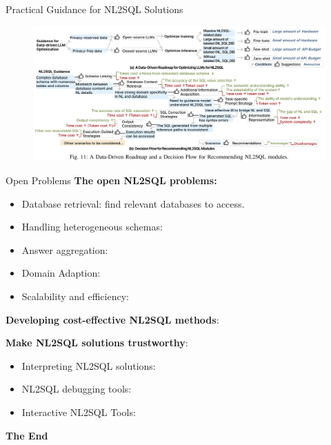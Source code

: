 \documentclass[aspectratio=169,xcolor=dvipsnames]{beamer}
\begin{document}

\begin{frame}{Practical Guidance for NL2SQL Solutions}
    \begin{figure}
        \includegraphics[width=\linewidth]{assets/roadmap.png}
    \end{figure}
\end{frame}


\begin{frame}{Open Problems}
\textbf{The open NL2SQL problems: }
\begin{itemize}
    \item Database retrieval: find relevant databases to access.
    \item Handling heterogeneous schemas:
    \item Answer aggregation:
    \item Domain Adaption:
    \item Scalability and efficiency:
\end{itemize}
\textbf{Developing cost-effective NL2SQL methods}:

\textbf{Make NL2SQL solutions trustworthy}:
\begin{itemize}
    \item Interpreting NL2SQL solutions:
    \item NL2SQL debugging tools:
    \item Interactive NL2SQL Tools:
\end{itemize}

\end{frame}


\begin{frame}
    \Huge{\centerline{\textbf{The End}}}
\end{frame}
\end{document}

